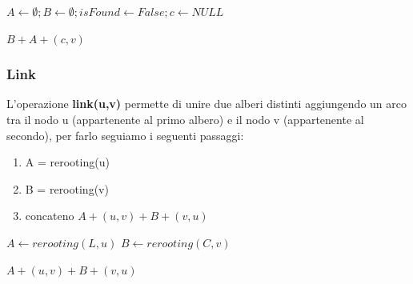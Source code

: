 \begin{algorithm}[H]
    \caption{Rerooting}
    \label{alg:rerooting}
    \SetAlgoLined
    \DontPrintSemicolon
    
    
    \BlankLine 

    
    $A \leftarrow \emptyset; B \leftarrow \emptyset; isFound \leftarrow False; c \leftarrow NULL$\;
    


    \Return $B + A + (c,v)$
\end{algorithm}

\subsubsection{Link}
L'operazione \textbf{link(u,v)} permette di unire due alberi distinti aggiungendo un arco tra il nodo u (appartenente al primo albero) e il nodo v (appartenente al secondo), per farlo seguiamo i seguenti passaggi:
\begin{enumerate}
    \item A = rerooting(u)
    \item B = rerooting(v) 
    \item concateno  $A + (u,v) + B + (v,u)$ 
\end{enumerate}

\begin{algorithm}[H]
    \caption{Link}
    \label{alg:link}
    \SetAlgoLined
    \DontPrintSemicolon
    
    
    \BlankLine 

    $A \leftarrow rerooting(L,u)$\;
    $B \leftarrow rerooting(C,v)$\;

    \Return $A + (u,v) + B + (v,u)$
    
\end{algorithm}

